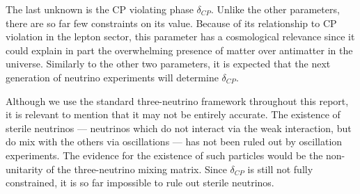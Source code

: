 
The last unknown is the CP violating phase $\delta_{CP}$. Unlike the other
parameters, there are so far few constraints on its value.
Because of its relationship to CP violation in the lepton sector, this
parameter has a cosmological relevance since it could explain in part the
overwhelming presence of matter over antimatter in the universe. Similarly to
the other two parameters, it is expected that the next generation of neutrino
experiments will determine $\delta_{CP}$.

Although we use the standard three-neutrino framework throughout this report,
it is relevant to mention that it may not be entirely accurate. The existence of
sterile neutrinos --- neutrinos which do not interact via the weak interaction,
but do mix with the others via oscillations --- has not been ruled out by
oscillation experiments. The evidence for the existence of such particles would
be the non-unitarity of the three-neutrino mixing matrix. Since
$\delta_{CP}$ is still not fully constrained, it is so far impossible to rule out
sterile neutrinos.
